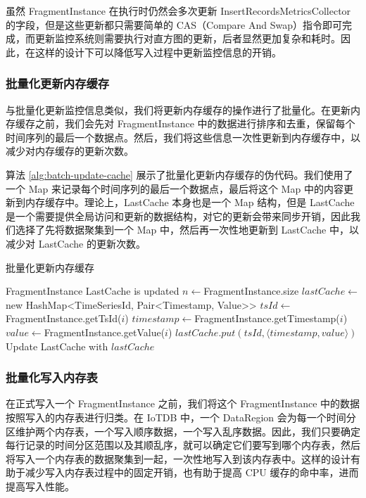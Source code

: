 虽然 FragmentInstance 在执行时仍然会多次更新 InsertRecordsMetricsCollector 的字段，但是这些更新都只需要简单的 CAS（Compare And Swap）指令即可完成，而更新监控系统则需要执行对直方图的更新，后者显然更加复杂和耗时。因此，在这样的设计下可以降低写入过程中更新监控信息的开销。
\subsubsection{批量化更新内存缓存}
与批量化更新监控信息类似，我们将更新内存缓存的操作进行了批量化。在更新内存缓存之前，我们会先对 FragmentInstance 中的数据进行排序和去重，保留每个时间序列的最后一个数据点。然后，我们将这些信息一次性更新到内存缓存中，以减少对内存缓存的更新次数。

算法 \ref{alg:batch-update-cache} 展示了批量化更新内存缓存的伪代码。我们使用了一个 Map 来记录每个时间序列的最后一个数据点，最后将这个 Map 中的内容更新到内存缓存中。理论上，LastCache 本身也是一个 Map 结构，但是 LastCache 是一个需要提供全局访问和更新的数据结构，对它的更新会带来同步开销，因此我们选择了先将数据聚集到一个 Map 中，然后再一次性地更新到 LastCache 中，以减少对 LastCache 的更新次数。
\begin{algorithm}
  \caption{批量化更新内存缓存}
  \label{alg:batch-update-cache}
  \small
  \begin{algorithmic}
    \REQUIRE FragmentInstance
    \ENSURE LastCache is updated
    \STATE $n \leftarrow $FragmentInstance.size
    \STATE $lastCache \leftarrow $new HashMap<TimeSeriesId, Pair<Timestamp, Value>>
    \STATE $tsId \leftarrow $FragmentInstance.getTsId($i$)
    \STATE $timestamp \leftarrow $FragmentInstance.getTimestamp($i$)
    \STATE $value \leftarrow $FragmentInstance.getValue($i$)
    \STATE $lastCache.put(tsId, \langle timestamp, value \rangle)$
    \ENDIF
    \ENDFOR
    \STATE Update LastCache with $lastCache$
  \end{algorithmic}
\end{algorithm}
\subsubsection{批量化写入内存表}
在正式写入一个 FragmentInstance 之前，我们将这个 FragmentInstance 中的数据按照写入的内存表进行归类。在 IoTDB 中，一个 DataRegion 会为每一个时间分区维护两个内存表，一个写入顺序数据，一个写入乱序数据。因此，我们只要确定每行记录的时间分区范围以及其顺乱序，就可以确定它们要写到哪个内存表，然后将写入一个内存表的数据聚集到一起，一次性地写入到该内存表中。这样的设计有助于减少写入内存表过程中的固定开销，也有助于提高 CPU 缓存的命中率，进而提高写入性能。
